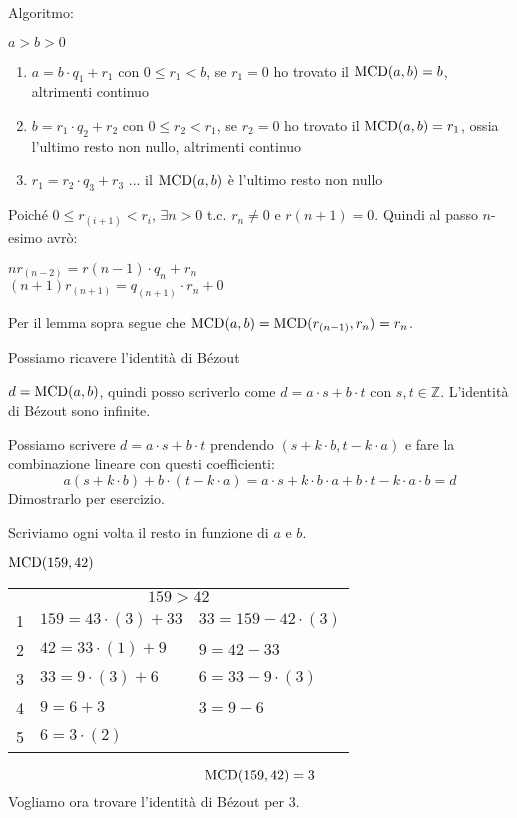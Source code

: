 Algoritmo:

$a > b > 0$

\begin{enumerate}
    \item $a = b \cdot q_1 + r_1$  con $0 \le r_1 < b$, se $r_1 = 0$ ho trovato il $\operatorname{MCD}(a,b) = b$, altrimenti continuo
    \item $b = r_1 \cdot q_2 + r_2$  con $0 \le r_2 < r_1$, se $r_2 = 0$ ho trovato il $\operatorname{MCD}(a,b) = r_1$, ossia l'ultimo resto non nullo, altrimenti continuo
    \item $r_1 = r_2 \cdot q_3 + r_3$ ... il $\operatorname{MCD}(a,b)$ \`e l'ultimo resto non nullo
\end{enumerate}

Poich\'e $0 \le r_{(i+1)} < r_i$, $\exists n > 0$ t.c. $r_{n} \neq 0$ e $r{(n+1)} = 0$. Quindi al passo $n$-esimo avr\`o:

$n r_{(n-2)} = r{(n-1)} \cdot q_n + r_n$ \\
$(n+1) r_{(n+1)} = q_{(n+1)} \cdot r_n + 0$

Per il lemma sopra segue che $\operatorname{MCD}(a,b) = \operatorname{MCD}(r_{(n-1)}, r_{n}) = r_{n}$.

Possiamo ricavere l'identit\`a di B\'ezout

$d = \operatorname{MCD}(a,b)$, quindi posso scriverlo come $d = a \cdot s + b \cdot t$ con $s, t \in \mathbb{Z}$. L'identit\`a di B\'ezout sono infinite.

Possiamo scrivere $d = a \cdot s + b \cdot t$ prendendo $(s + k \cdot b, t - k \cdot a)$ e fare la combinazione lineare con questi coefficienti:
\[
a (s + k \cdot b) + b \cdot (t - k \cdot a) = a \cdot s + k \cdot b \cdot a + b \cdot t - k \cdot a \cdot b = d
\]
Dimostrarlo per esercizio.

Scriviamo ogni volta il resto in funzione di $a$ e $b$.

$\operatorname{MCD}(159, 42)$

\begin{tabular}{*{3}{l}}
\multicolumn{3}{c}{$159 > 42$} \\
1 & $159 = 43 \cdot (3) + 33$     & $33 = 159 - 42 \cdot (3)$ \\ 
2 & $42 = 33 \cdot (1) + 9$       & $9 = 42 - 33$ \\
3 & $33 = 9 \cdot (3) + 6$        & $6 = 33 - 9 \cdot (3)$ \\
4 & $9 = 6 + 3$             & $3 = 9 - 6$ \\
5 & $6 = 3 \cdot (2)$ & \
\end{tabular}

\[
\operatorname{MCD}(159, 42) = 3
\]
Vogliamo ora trovare l'identit\`a di B\'ezout per 3.

